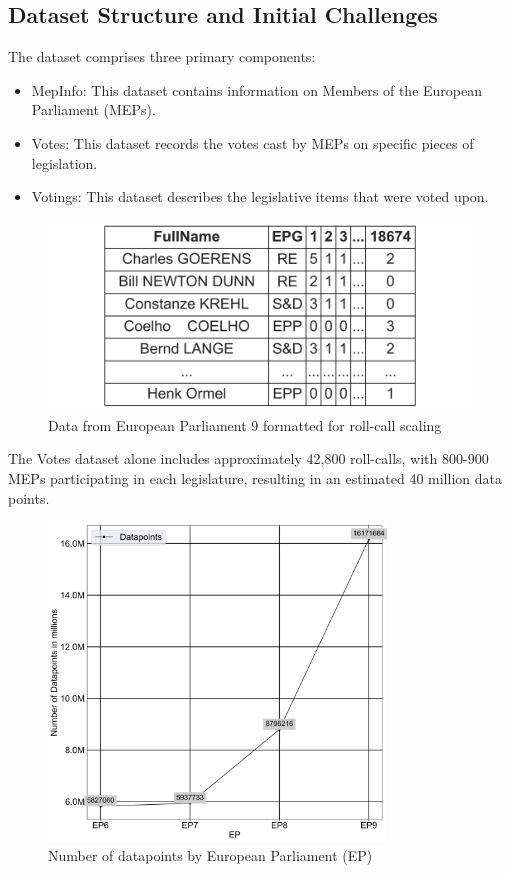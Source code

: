 \documentclass{article}
\begin{document}
    \subsection{Dataset Structure and Initial Challenges}

    The dataset comprises three primary components:


    \begin{itemize}
        \item MepInfo: This dataset contains information on Members of the European Parliament (MEPs).
        \item Votes: This dataset records the votes cast by MEPs on specific pieces of legislation.
        \item Votings: This dataset describes the legislative items that were voted upon.
    \end{itemize}
    \begin{figure}[htb]
        \centering
        \includegraphics[width=1\textwidth]{Graphs/short_table9.png}
        \caption{Data from European Parliament 9 formatted for roll-call scaling}
        \label{fig:Structure table}
    \end{figure}

    The Votes dataset alone includes approximately 42,800 roll-calls, with 800-900 MEPs participating in each
    legislature, resulting in an estimated 40 million data points.
    \begin{figure}[htb]
        \centering
        \includegraphics[width=0.8\textwidth]{Graphs/Datapoints.png}
        \caption{Number of datapoints by European Parliament (EP)}
        \label{fig:Datapoint graph}
    \end{figure}
\end{document}
